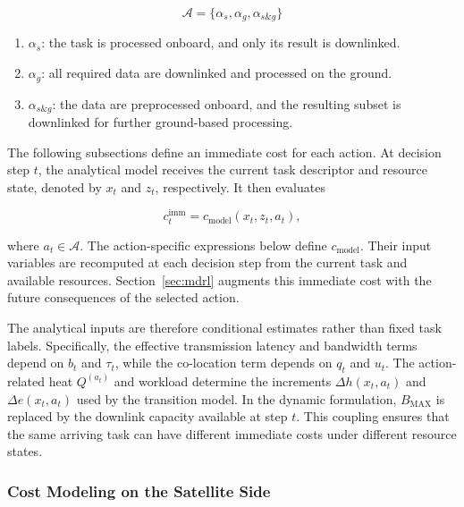 \documentclass[lettersize,journal]{IEEEtran}
\begin{document}
\begin{equation}
\mathcal{A} = \{\alpha_{s},\alpha_{g}, \alpha_{s\&g}\}
\label{eq:action space}
\end{equation}

\begin{enumerate}
    \item $\alpha_{s}$: the task is processed onboard, and only its result is downlinked.
    \item $\alpha_{g}$: all required data are downlinked and processed on the ground.
    \item $\alpha_{s\&g}$: the data are preprocessed onboard, and the resulting subset is downlinked for further ground-based processing.
\end{enumerate}

The following subsections define an immediate cost for each action. At decision step $t$, the analytical model receives the current task descriptor and resource state, denoted by $x_t$ and $z_t$, respectively. It then evaluates

\begin{equation}
c^{\mathrm{imm}}_t = c_{\mathrm{model}}(x_t,z_t,a_t),
\label{eq:immediate_cost}
\end{equation}

where $a_t\in\mathcal{A}$. The action-specific expressions below define $c_{\mathrm{model}}$. Their input variables are recomputed at each decision step from the current task and available resources. Section~\ref{sec:mdrl} augments this immediate cost with the future consequences of the selected action.

The analytical inputs are therefore conditional estimates rather than fixed task labels. Specifically, the effective transmission latency and bandwidth terms depend on $b_t$ and $\tau_t$, while the co-location term depends on $q_t$ and $u_t$. The action-related heat $Q^{(a_t)}$ and workload determine the increments $\Delta h(x_t,a_t)$ and $\Delta e(x_t,a_t)$ used by the transition model. In the dynamic formulation, $B_{\mathrm{MAX}}$ is replaced by the downlink capacity available at step $t$. This coupling ensures that the same arriving task can have different immediate costs under different resource states.

\subsubsection{Cost Modeling on the Satellite Side}
\end{document}

